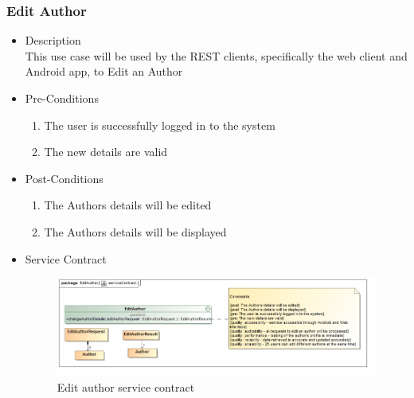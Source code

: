 \documentclass[a4paper,10pt]{article}
\begin{document}
\subsubsection{Edit Author}
	\begin{itemize}
		\item Description\\
		This use case will be used by the REST clients, specifically the web client and Android app, to Edit an Author
		\item Pre-Conditions
		\begin{enumerate}
			\item The user is successfully logged in to the system
			\item The new details are valid
		\end{enumerate}
		\item Post-Conditions
		\begin{enumerate}
			\item The Authors details will be edited
			\item The Authors details will be displayed
			
		\end{enumerate}
		\item Service Contract
		\begin{figure}[H]
			\includegraphics[scale=0.5]{EditAuthorServiceContract}
			\caption{Edit author service contract}
		\end{figure}
	\end{itemize}
\end{document}
